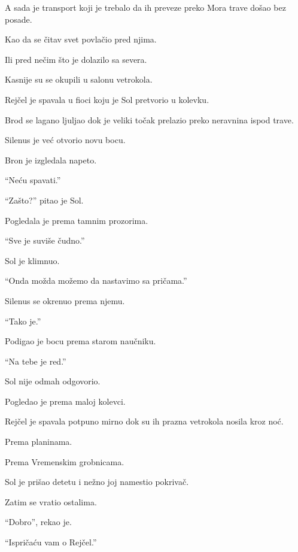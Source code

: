 A sada je transport koji je trebalo da ih preveze preko Mora trave došao bez posade.

Kao da se čitav svet povlačio pred njima.

Ili pred nečim što je dolazilo sa severa.

\bigskip

Kasnije su se okupili u salonu vetrokola.

Rejčel je spavala u fioci koju je Sol pretvorio u kolevku.

Brod se lagano ljuljao dok je veliki točak prelazio preko neravnina ispod trave.

Silenus je već otvorio novu bocu.

Bron je izgledala napeto.

``Neću spavati.''

``Zašto?'' pitao je Sol.

Pogledala je prema tamnim prozorima.

``Sve je suviše čudno.''

Sol je klimnuo.

``Onda možda možemo da nastavimo sa pričama.''

Silenus se okrenuo prema njemu.

``Tako je.''

Podigao je bocu prema starom naučniku.

``Na tebe je red.''

Sol nije odmah odgovorio.

Pogledao je prema maloj kolevci.

Rejčel je spavala potpuno mirno dok su ih prazna vetrokola nosila kroz noć.

Prema planinama.

Prema Vremenskim grobnicama.

Sol je prišao detetu i nežno joj namestio pokrivač.

Zatim se vratio ostalima.

``Dobro'', rekao je.

``Ispričaću vam o Rejčel.''

